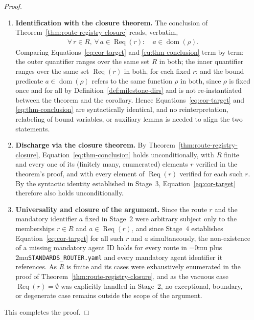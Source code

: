 \documentclass[12pt]{article}
\theoremstyle{definition}
\DeclareRobustCommand{\code}[1]{\begingroup\Urlmuskip=0mu plus 2mu\relax\nolinkurl{#1}\endgroup}
\begin{document}
\begin{proof}
\begin{enumerate}
      \item \textbf{Identification with the closure theorem.} The
      conclusion of Theorem~\ref{thm:route-registry-closure} reads,
      verbatim,
      \begin{align}
        \forall\, r \in R,\ \forall\, a \in \operatorname{Req}(r):
        \quad a \in \operatorname{dom}(\rho).
        \label{eq:thm-conclusion}
      \end{align}
      Comparing Equations~\eqref{eq:cor-target} and
      \eqref{eq:thm-conclusion} term by term: the outer quantifier
      ranges over the same set $R$ in both; the inner quantifier
      ranges over the same set $\operatorname{Req}(r)$ in both, for
      each fixed $r$; and the bound predicate
      $a \in \operatorname{dom}(\rho)$ refers to the same function
      $\rho$ in both, since $\rho$ is fixed once and for all by
      Definition~\ref{def:milestone-dirs} and is not re-instantiated
      between the theorem and the corollary. Hence
      Equations~\eqref{eq:cor-target} and \eqref{eq:thm-conclusion}
      are syntactically identical, and no reinterpretation,
      relabeling of bound variables, or auxiliary lemma is needed to
      align the two statements.

      \item \textbf{Discharge via the closure theorem.} By
      Theorem~\ref{thm:route-registry-closure},
      Equation~\eqref{eq:thm-conclusion} holds unconditionally, with
      $R$ finite and every one of its (finitely many, enumerated)
      elements $r$ verified in the theorem's proof, and with every
      element of $\operatorname{Req}(r)$ verified for each such $r$.
      By the syntactic identity established in Stage~3,
      Equation~\eqref{eq:cor-target} therefore also holds
      unconditionally.

      \item \textbf{Universality and closure of the argument.} Since
      the route $r$ and the mandatory identifier $a$ fixed in
      Stage~2 were arbitrary subject only to the memberships
      $r \in R$ and $a \in \operatorname{Req}(r)$, and since Stage~4
      establishes Equation~\eqref{eq:cor-target} for all such $r$ and
      $a$ simultaneously, the non-existence of a missing mandatory
      agent ID holds for every route in
      \code{STANDARDS\_ROUTER.yaml} and every mandatory agent
      identifier it references. As $R$ is finite and its cases were
      exhaustively enumerated in the proof of
      Theorem~\ref{thm:route-registry-closure}, and as the vacuous
      case $\operatorname{Req}(r) = \emptyset$ was explicitly handled
      in Stage~2, no exceptional, boundary, or degenerate case
      remains outside the scope of the argument.
\end{enumerate}

This completes the proof.
\end{proof}
\end{document}
